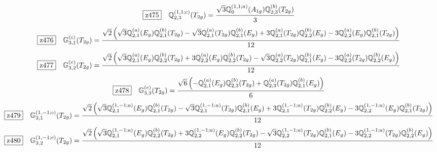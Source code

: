 \documentclass[fleqn,10pt,landscape]{jsarticle}
\begin{document}
\begin{dmath*}
\hspace*{3mm}\fbox{z475}\quad \mathbb{Q}_{2,3}^{(1,1;c)}(T_{2g})=\frac{\sqrt{3} \mathbb{Q}_{0}^{(1,1;a)}(A_{1g}) \mathbb{Q}_{2,3}^{(b)}(T_{2g})}{3}
\end{dmath*}
\begin{dmath*}
\hspace*{3mm}\fbox{z476}\quad \mathbb{G}_{3,1}^{(c)}(T_{2g})=\frac{\sqrt{2} \left(\sqrt{3} \mathbb{Q}_{2,1}^{(a)}(E_{g}) \mathbb{Q}_{2,1}^{(b)}(T_{2g}) - \sqrt{3} \mathbb{Q}_{2,1}^{(a)}(T_{2g}) \mathbb{Q}_{2,1}^{(b)}(E_{g}) + 3 \mathbb{Q}_{2,1}^{(a)}(T_{2g}) \mathbb{Q}_{2,2}^{(b)}(E_{g}) - 3 \mathbb{Q}_{2,2}^{(a)}(E_{g}) \mathbb{Q}_{2,1}^{(b)}(T_{2g})\right)}{12}
\end{dmath*}
\begin{dmath*}
\hspace*{3mm}\fbox{z477}\quad \mathbb{G}_{3,2}^{(c)}(T_{2g})=\frac{\sqrt{2} \left(\sqrt{3} \mathbb{Q}_{2,1}^{(a)}(E_{g}) \mathbb{Q}_{2,2}^{(b)}(T_{2g}) + 3 \mathbb{Q}_{2,2}^{(a)}(E_{g}) \mathbb{Q}_{2,2}^{(b)}(T_{2g}) - \sqrt{3} \mathbb{Q}_{2,2}^{(a)}(T_{2g}) \mathbb{Q}_{2,1}^{(b)}(E_{g}) - 3 \mathbb{Q}_{2,2}^{(a)}(T_{2g}) \mathbb{Q}_{2,2}^{(b)}(E_{g})\right)}{12}
\end{dmath*}
\begin{dmath*}
\hspace*{3mm}\fbox{z478}\quad \mathbb{G}_{3,3}^{(c)}(T_{2g})=\frac{\sqrt{6} \left(- \mathbb{Q}_{2,1}^{(a)}(E_{g}) \mathbb{Q}_{2,3}^{(b)}(T_{2g}) + \mathbb{Q}_{2,3}^{(a)}(T_{2g}) \mathbb{Q}_{2,1}^{(b)}(E_{g})\right)}{6}
\end{dmath*}
\begin{dmath*}
\hspace*{3mm}\fbox{z479}\quad \mathbb{G}_{3,1}^{(1,-1;c)}(T_{2g})=\frac{\sqrt{2} \left(\sqrt{3} \mathbb{Q}_{2,1}^{(1,-1;a)}(E_{g}) \mathbb{Q}_{2,1}^{(b)}(T_{2g}) - \sqrt{3} \mathbb{Q}_{2,1}^{(1,-1;a)}(T_{2g}) \mathbb{Q}_{2,1}^{(b)}(E_{g}) + 3 \mathbb{Q}_{2,1}^{(1,-1;a)}(T_{2g}) \mathbb{Q}_{2,2}^{(b)}(E_{g}) - 3 \mathbb{Q}_{2,2}^{(1,-1;a)}(E_{g}) \mathbb{Q}_{2,1}^{(b)}(T_{2g})\right)}{12}
\end{dmath*}
\begin{dmath*}
\hspace*{3mm}\fbox{z480}\quad \mathbb{G}_{3,2}^{(1,-1;c)}(T_{2g})=\frac{\sqrt{2} \left(\sqrt{3} \mathbb{Q}_{2,1}^{(1,-1;a)}(E_{g}) \mathbb{Q}_{2,2}^{(b)}(T_{2g}) + 3 \mathbb{Q}_{2,2}^{(1,-1;a)}(E_{g}) \mathbb{Q}_{2,2}^{(b)}(T_{2g}) - \sqrt{3} \mathbb{Q}_{2,2}^{(1,-1;a)}(T_{2g}) \mathbb{Q}_{2,1}^{(b)}(E_{g}) - 3 \mathbb{Q}_{2,2}^{(1,-1;a)}(T_{2g}) \mathbb{Q}_{2,2}^{(b)}(E_{g})\right)}{12}
\end{dmath*}
\end{document}
